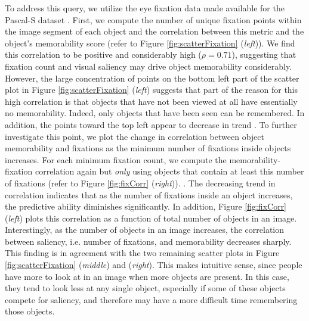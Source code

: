 To address this query, we utilize the eye fixation data made available for the Pascal-S dataset \cite{yin14}. First, we compute the number of unique fixation points within the image segment of each object and the correlation between this metric and the object’s memorability score (refer to Figure \ref{fig:scatterFixation} (\emph{left})). We find this correlation to be positive and considerably high ($\rho = 0.71$), suggesting that fixation count and visual saliency may drive object memorability considerably. However, the large concentration of points on the bottom left part of the scatter plot in Figure \ref{fig:scatterFixation} (\emph{left}) suggests that part of the reason for this high correlation is that objects that have not been viewed  at all have essentially no memorability. Indeed, only objects that have been seen can be remembered. In addition, the points toward the top left appear to decrease in trend . To further investigate this point, we plot the change in correlation between object memorability and fixations as the minimum number of fixations inside objects increases. For each minimum fixation count, we compute the memorability-fixation correlation again but \emph{only} using objects that contain at least this number of fixations (refer to Figure \ref{fig:fixCorr} (\emph{right})). . The decreasing trend in correlation indicates that as the number of fixations inside an object increases, the predictive ability diminishes significantly.  In addition, Figure \ref{fig:fixCorr} (\emph{left}) plots this correlation as a function of total number of objects in an image. Interestingly, as the number of objects in an image increases, the correlation between saliency, i.e. number of fixations, and memorability decreases sharply. This finding is in agreement with the two remaining scatter plots in Figure \ref{fig:scatterFixation} (\emph{middle}) and (\emph{right}). This makes intuitive sense, since people have more to look at in an image when more objects are present. In this case, they tend to look less at any single object, especially if some of these objects compete for saliency, and therefore may have a more difficult time remembering those objects.



